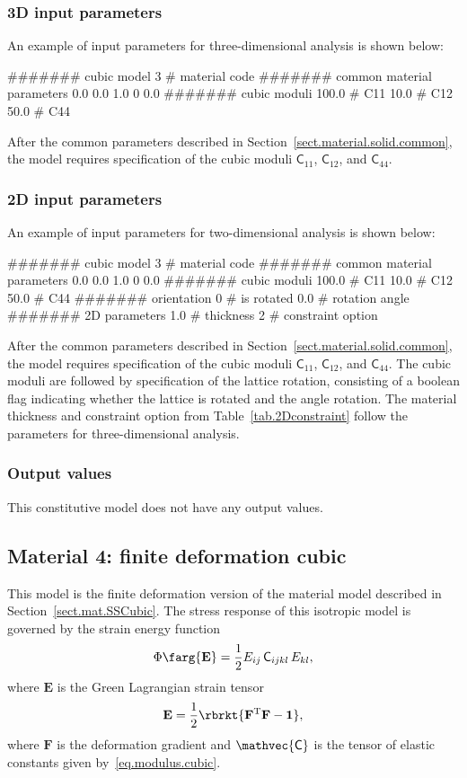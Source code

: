 \subsubsection{3D input parameters}
An example of input parameters for three-dimensional analysis is shown 
below:
\begin{inputfile}
####### cubic model
3     # material code
####### common material parameters
0.0    0.0    1.0
0      0.0
####### cubic moduli
100.0 # C11
 10.0 # C12
 50.0 # C44
\end{inputfile}
After the common parameters described in 
Section~\ref{sect.material.solid.common}, the 
model requires specification of the cubic moduli
$\mathsf{C}_{11}$, $\mathsf{C}_{12}$, and
$\mathsf{C}_{44}$.

\subsubsection{2D input parameters}
An example of input parameters for two-dimensional analysis is shown 
below:
\begin{inputfile}
####### cubic model
3     # material code
####### common material parameters
0.0    0.0    1.0
0      0.0
####### cubic moduli
100.0 # C11
 10.0 # C12
 50.0 # C44
####### orientation
0     # is rotated
0.0   # rotation angle 
####### 2D parameters
1.0   # thickness
2     # constraint option
\end{inputfile}
After the common parameters described in 
Section~\ref{sect.material.solid.common}, the 
model requires specification of the cubic moduli
$\mathsf{C}_{11}$, $\mathsf{C}_{12}$, and
$\mathsf{C}_{44}$.
The cubic moduli are followed by specification of the lattice 
rotation, consisting of a boolean flag indicating whether the lattice 
is rotated and the angle rotation.
The material thickness and 
constraint option from Table~\ref{tab.2Dconstraint} 
follow the parameters for three-dimensional analysis.

\subsubsection{Output values}
This constitutive model does not have any output values.

\subsection{Material 4: finite deformation cubic}
\label{sect.mat.FDCubic}
This model is the finite deformation version of the material model
described in Section~\ref{sect.mat.SSCubic}.
The stress response of this isotropic model is 
governed by the strain energy function
\begin{equation}
\Phi\farg{\mathbf{E}}=
\frac{1}{2} E_{ij}\,\mathsf{C}_{ijkl}\,E_{kl},
\end{equation}
where $\mathbf{E}$ is the Green Lagrangian strain tensor
\begin{equation}
	\mathbf{E} = \frac{1}{2}\rbrkt{
	\mathbf{F}^{\text{T}}\mathbf{F} - \mathbf{1}},
\end{equation}
where $\mathbf{F}$ is the deformation gradient
and $\mathvec{\mathsf{C}}$ is the tensor of 
elastic constants given by~\eqref{eq.modulus.cubic}.

